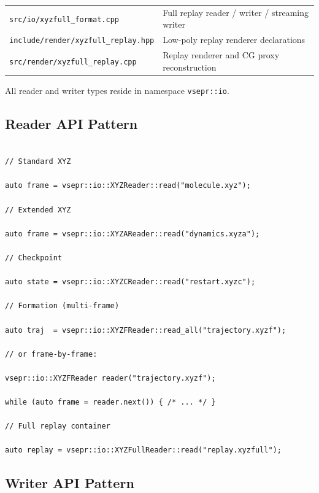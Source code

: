 \documentclass[12pt, a4paper, oneside]{article}
\newcommand{\file}[1]{\texttt{#1}}
\newcommand{\type}[1]{\texttt{#1}}
\begin{document}
\begin{table}[htbp]
\begin{tabular}{lp{8.5cm}}
    \file{src/io/xyzfull\_format.cpp}

      & Full replay reader / writer / streaming writer \\

    \file{include/render/xyzfull\_replay.hpp}

      & Low-poly replay renderer declarations \\

    \file{src/render/xyzfull\_replay.cpp}

      & Replay renderer and CG proxy reconstruction \\

    \bottomrule

  \end{tabular}

\end{table}


All reader and writer types reside in namespace \type{vsepr::io}.


\subsection{Reader API Pattern}


\begin{lstlisting}

// Standard XYZ

auto frame = vsepr::io::XYZReader::read("molecule.xyz");

// Extended XYZ

auto frame = vsepr::io::XYZAReader::read("dynamics.xyza");

// Checkpoint

auto state = vsepr::io::XYZCReader::read("restart.xyzc");

// Formation (multi-frame)

auto traj  = vsepr::io::XYZFReader::read_all("trajectory.xyzf");

// or frame-by-frame:

vsepr::io::XYZFReader reader("trajectory.xyzf");

while (auto frame = reader.next()) { /* ... */ }

// Full replay container

auto replay = vsepr::io::XYZFullReader::read("replay.xyzfull");

\end{lstlisting}


\subsection{Writer API Pattern}
\end{document}
